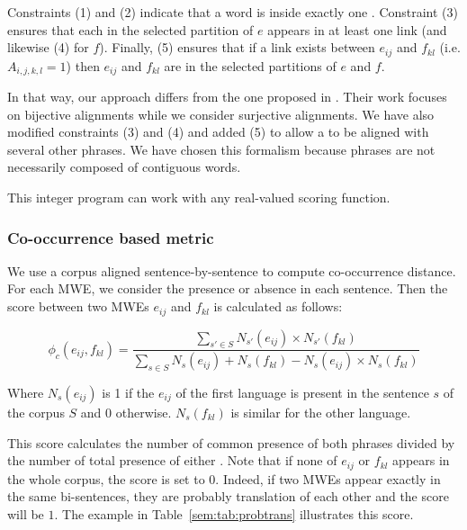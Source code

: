 \documentclass[output=paper,modfonts,nonflat]{langsci/langscibook}
\begin{document}
Constraints (1) and (2) indicate that a word is inside exactly one . Constraint (3) ensures that each  in the selected partition of $e$ appears in at least one link (and likewise  (4) for $f$). Finally,  (5) ensures that if a link exists between $e_{ij}$ and $f_{kl}$ (i.e. $A_{i,j,k,l}=1$) then $e_{ij}$ and $f_{kl}$ are in the selected partitions of $e$ and $f$.

In that way, our approach differs from the one proposed in \citet{denero2008complexity}. 
Their work focuses on bijective alignments while we consider surjective alignments. 
We have also modified constraints (3) and (4) and added  (5) to allow a  to be aligned with several other phrases. 
We have chosen this formalism because phrases are not necessarily composed of contiguous words.

This integer program can work with any real-valued scoring function.

\subsubsection{Co-occurrence based metric}\label{sec:semmar:4.3.2}

We use a corpus aligned sentence-by-sentence to compute co-occurrence distance. For each MWE, we consider the presence or absence in each sentence. Then the score between two MWEs $e_{ij}$ and $f_{kl}$ is calculated as follows:

\begin{equation}
\phi_c(e_{ij},f_{kl})=\frac{\sum\limits_{s'\in S} N_{s'}(e_{ij}) \times N_{s'}(f_{kl})}{\sum\limits_{s\in S} N_{s}(e_{ij}) + N_{s}(f_{kl}) - N_{s}(e_{ij}) \times N_{s}(f_{kl})}
\end{equation}

Where $N_{s}(e_{ij})$ is 1 if the  $e_{ij}$ of the first language is present in the sentence $s$ of the corpus $S$ and $0$ otherwise. 
$N_{s}(f_{kl})$ is similar for the other language.

This score calculates the number of common presence of both phrases divided by the number of total presence of either . 
Note that if none of $e_{ij}$ or $f_{kl}$ appears in the whole corpus, the score is set to $0$. 
Indeed, if two MWEs appear exactly in the same bi-sentences, they are probably translation of each other and the score will be $1$. 
The example in Table~\ref{sem:tab:probtrans} illustrates this score.
\end{document}

